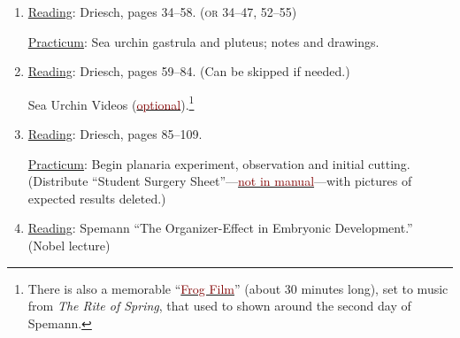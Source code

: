 \documentclass{article}
\newcommand{\rd}{\uline{Reading}}
\newcommand{\pc}{\uline{Practicum}}
\begin{document}
\begin{enumerate}
	\pc: Sea urchin fertilization and early development; notes and drawings. Observing fertilization and
	its immediate effect on the egg can be done at the beginning of the class. After discussing the reading, students can return to the microscopes, late in the class, to observe early cleavage.
	\item \rd: Driesch, pages 34--58. (\textsc{or} 34--47, 52--55)

	\pc: Sea urchin gastrula and pluteus; notes and drawings.
\item \rd: Driesch, pages 59--84. (Can be skipped if needed.)

Sea Urchin Videos (\href{https://sjca.sharepoint.com/sites/SJCLab/SitePages/Sea-Urchin-Videos.aspx?csf=1&web=1&e=TMKe6l&CID=2e377289-0a6e-4f86-9e8e-49db30a84b8e}{\textcolor{Maroon}{optional}}).\footnote{There is also a memorable ``\href{https://sjca.sharepoint.com/sites/SJCLab/_layouts/15/stream.aspx?id=\%2Fsites\%2FSJCLab\%2FShared\%20Documents\%2FFRESHMAN\%20LAB\%2FFR1\%2DObserving\%20Living\%20Beings\%2FPracticums\%2F23\%20\%2D\%20Frog\%2FThe\%20Frog\%2Em4v&referrer=StreamWebApp\%2EWeb&referrerScenario=AddressBarCopied\%2Eview\%2Ee3305199\%2D3d78\%2D4523\%2Db488\%2D99c2625c582c}{\textcolor{Maroon}{Frog Film}}'' (about 30 minutes long), set to music from \emph{The Rite of Spring}, that used to shown around the second day of Spemann.}   %
 
\item \rd: Driesch, pages 85--109.

	\pc: Begin planaria
	experiment, observation and initial cutting. (Distribute ``Student Surgery Sheet''---\hyperlink{surgery.1}{\textcolor{Maroon}{not in manual}}---with pictures of expected results deleted.) %
	\item \rd: Spemann ``The Organizer-Effect in Embryonic Development.'' (Nobel lecture)
	
	


\end{enumerate}
\end{document}
